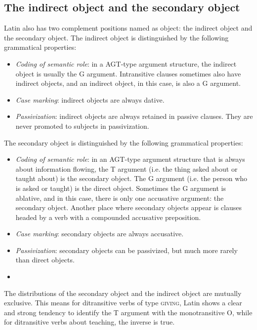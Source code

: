 \documentclass[a4paper, oneside]{report}
\newcommand{\classify}[1]{{\textsc{#1}}}
\begin{document}
\subsection{The indirect object and the secondary object}\label{sec:vp.complement.indirect-object}

Latin also has two complement positions named as object:
the indirect object and the secondary object.
The indirect object is distinguished by the following grammatical properties:
\begin{itemize}
    \item \emph{Coding of semantic role}: in a AGT-type argument structure, 
    the indirect object is usually the G argument.
    Intransitive clauses sometimes also have indirect objects, 
    and an indirect object, in this case, is also a G argument.
    \item \emph{Case marking}: indirect objects are always dative.
    \item \emph{Passivization}: indirect objects are always retained in passive clauses. 
    They are never promoted to subjects in passivization.
\end{itemize}

The secondary object is distinguished by the following grammatical properties:
\begin{itemize}
    \item \emph{Coding of semantic role}: in an AGT-type argument structure
    that is always about information flowing,
    the T argument (i.e. the thing asked about or taught about) is the secondary object.
    The G argument (i.e. the person who is asked or taught) is the direct object.
    Sometimes the G argument is ablative, and in this case, 
    there is only one accusative argument: the secondary object.
    Another place where secondary objects appear is 
    clauses headed by a verb with a compounded accusative preposition. %
    \item \emph{Case marking}: secondary objects are always accusative.
    \item \emph{Passivization}: secondary objects can be passivized, but much more rarely than direct objects.
    \item %
\end{itemize}

The distributions of the secondary object and the indirect object 
are mutually exclusive.
This means for ditransitive verbs of type \classify{giving}, 
Latin shows a clear and strong tendency to identify the T argument with the monotransitive O,
while for ditransitive verbs about teaching,
the inverse is true.
\end{document}

